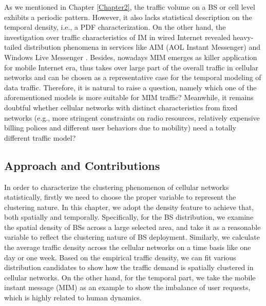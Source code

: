 As we mentioned in Chapter \ref{Chapter2}, the traffic volume on a BS or cell level exhibits a periodic pattern. However, it also lacks statistical description on the temporal density, i.e., a PDF characterization. On the other hand, the investigation over traffic characteristics of IM in wired Internet revealed heavy-tailed distribution phenomena in services like AIM (AOL Instant Messenger) and Windows Live Messenger \cite{xiao2007understanding,leskovec2008planetary}. Besides, nowadays MIM emerges as killer application for mobile Internet era, thus takes over large part of the overall traffic in cellular networks and can be chosen as a representative case for the temporal modeling of data traffic. Therefore, it is natural to raise a question, namely which one of the aforementioned models is more suitable for MIM traffic? Meanwhile, it remains doubtful whether cellular networks with distinct characteristics from fixed networks (e.g., more stringent constraints on radio resources, relatively expensive billing polices and different user behaviors due to mobility) \cite{li2014prediction} need a totally different traffic model?

\subsection{Approach and Contributions}
In order to characterize the clustering phenomenon of cellular networks statistically, firstly we need to choose the proper variable to represent the clustering nature. In this chapter, we adopt the density feature to achieve that, both spatially and temporally. Specifically, for the BS distribution, we examine the spatial density of BSs across a large selected area, and take it as a reasonable variable to reflect the clustering nature of BS deployment. Similarly, we calculate the average traffic density across the cellular networks on a time basis like one day or one week. Based on the empirical traffic density, we can fit various distribution candidates to show how the traffic demand is spatially clustered in cellular networks. On the other hand, for the temporal part, we take the mobile instant message (MIM) as an example to show the imbalance of user requests, which is highly related to human dynamics.

